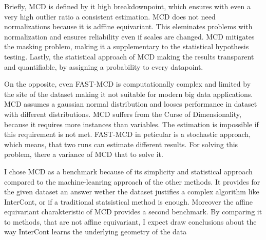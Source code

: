 Briefly, MCD is defined by it high breakdownpoint, which ensures with even a very high outlier ratio a consistent estimation.
MCD does not need normalizations because it is adffine equivariant. 
This eleminates problems with normalization and ensures reliability even if scales are changed.
MCD mitigates the masking problem, making it a supplementary to the statistical hypothesis testing.
Lastly, the statistical approach of MCD making the results transparent and quantifiable, by assigning a probability to every datapoint.


On the opposite, even FAST-MCD is computationally complex and limited by the site of the dataset making it not suitable for modern big data applications.
MCD assumes a gaussian normal distribution and looses performance in dataset with different distributions.
MCD suffers from the Curse of Dimensionality, because it requires more instances than variables. 
The estimation is impossible if this requirement is not met.
FAST-MCD in peticular is a stochastic approach, which means, that two runs can estimate different results.
For solving this problem, there a variance of MCD that to solve it. \citep[p.5]{smiti2020critical}


I chose MCD as a benchmark because of its simplicity and statistical approach compared to the machine-leanring approach of the other methods.
It provides for the given dataset an answer wether the dataset justifies a complex algorithm like InterCont, or if a traditional statsistical method is enough. 
Moreover the affine equivariant charakteristic of MCD provides a second benchmark.
By comparing it to methods, that are not affine equivariant, I expect draw conclusions about the way InterCont learns the underlying geometry of the data 
